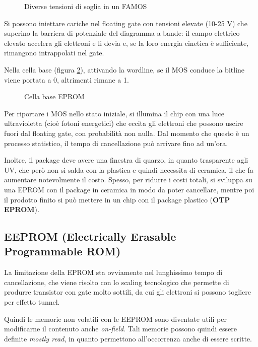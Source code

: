 \documentclass[11pt,4paper]{report}
\begin{document}
\begin{figure}[hbtp]
	\centering
	
	\caption{Diverse tensioni di soglia in un FAMOS}
	\label{fig:vth_famos}
\end{figure}

Si possono iniettare cariche nel floating gate con tensioni elevate (10-25 V) che superino la barriera di potenziale del diagramma a bande: il campo elettrico elevato accelera gli elettroni e li devia e, se la loro energia cinetica è sufficiente, rimangono intrappolati nel gate.

Nella cella base (figura \ref{fig:eprom}), attivando la wordline, se il MOS conduce la bitline viene portata a 0, altrimenti rimane a 1.

\begin{figure}[hbtp]
	\centering
	
	\caption{Cella base EPROM}
	\label{fig:eprom}
\end{figure}

Per riportare i MOS nello stato iniziale, si illumina il chip con una luce ultravioletta (cioè fotoni energetici) che eccita gli elettroni che possono uscire fuori dal floating gate, con probabilità non nulla. Dal momento che questo è un processo statistico, il tempo di cancellazione può arrivare fino ad un'ora.

Inoltre, il package deve avere una finestra di quarzo, in quanto trasparente agli UV, che però non si salda con la plastica e quindi necessita di ceramica, il che fa aumentare notevolmente il costo. Spesso, per ridurre i costi totali, si sviluppa su una EPROM con il package in ceramica in modo da poter cancellare, mentre poi il prodotto finito si può mettere in un chip con il package plastico (\textbf{OTP EPROM}).

\subsection{EEPROM (Electrically Erasable Programmable ROM)}
La limitazione della EPROM sta ovviamente nel lunghissimo tempo di cancellazione, che viene risolto con lo scaling tecnologico che permette di produrre transistor con gate molto sottili, da cui gli elettroni si possono togliere per effetto tunnel.

Quindi le memorie non volatili con le EEPROM sono diventate utili per modificarne il contenuto anche \emph{on-field}. Tali memorie possono quindi essere definite \emph{mostly read}, in quanto permettono all'occorrenza anche di essere scritte.
\end{document}

